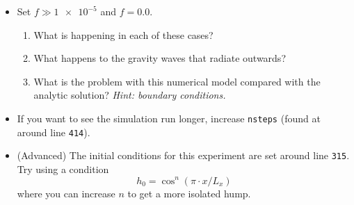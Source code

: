\documentclass[a4paper, sfsidenotes, twoside]{tufte-handout}
\begin{document}
\begin{itemize}
    \begin{itemize}
      \item Set $f \gg \num{1e-5}$ and $f = \num{0.0}$.
      \begin{enumerate}
        \item What is happening in each of these cases?
        \item What happens to the gravity waves that radiate outwards?
        \item What is the problem with this numerical model compared with the analytic solution? \emph{Hint: boundary conditions.}
      \end{enumerate}
      \item If you want to see the simulation run longer, increase \texttt{nsteps} (found at around line \texttt{414}).
      \item (Advanced) The initial conditions for this experiment are set around line \texttt{315}.
      Try using a condition
      \begin{equation*}
        h_0 = \cos^n(\pi \cdot x / L_x)
      \end{equation*}
      where you can increase $n$ to get a more isolated hump.
    \end{itemize}
  \end{itemize}
\end{document}
